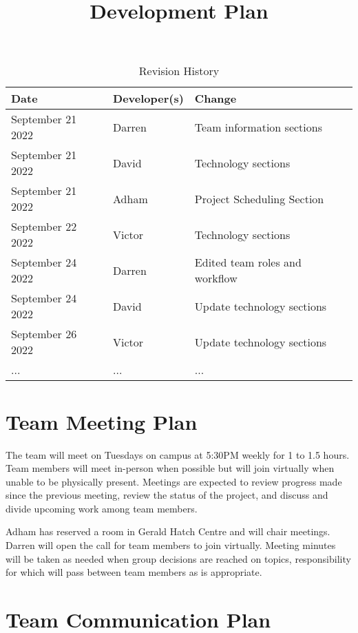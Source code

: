 \documentclass{article}
\title{Development Plan\\\progname}
\author{\authname}
\date{}
\begin{document}
\maketitle

\begin{table}[hp]
\caption{Revision History} \label{TblRevisionHistory}
\begin{tabularx}{\textwidth}{llX}
\toprule
\textbf{Date} & \textbf{Developer(s)} & \textbf{Change}\\
\midrule
September 21 2022 & Darren & Team information sections\\
September 21 2022 & David & Technology sections\\
September 21 2022 & Adham & Project Scheduling Section\\
September 22 2022 & Victor & Technology sections\\
September 24 2022 & Darren & Edited team roles and workflow\\
September 24 2022 & David & Update technology sections\\
September 26 2022 & Victor & Update technology sections\\
... & ... & ...\\
\bottomrule
\end{tabularx}
\end{table}



\section{Team Meeting Plan}

The team will meet on Tuesdays on campus at 5:30PM weekly for 1 to 1.5 hours. Team members will meet in-person when possible but will join virtually when unable to be physically present. Meetings are expected to review progress made since the previous meeting, review the status of the project, and discuss and divide upcoming work among team members.

Adham has reserved a room in Gerald Hatch Centre and will chair meetings. Darren will open the call for team members to join virtually. Meeting minutes will be taken as needed when group decisions are reached on topics, responsibility for which will pass between team members as is appropriate.

\section{Team Communication Plan}
\end{document}
